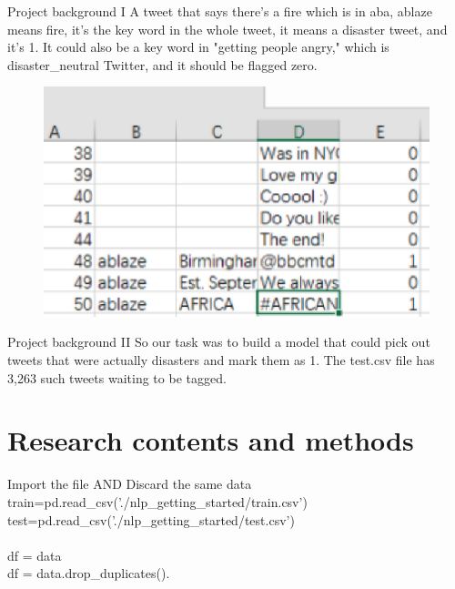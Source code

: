 \documentclass[
 size=14pt,
 paper=smartboard,  %
 mode=present, 		%
 display=slides, 	%
 style=tuliplab,  	%
 pauseslide,
 fleqn,leqno]{powerdot}
\begin{document}
\begin{slide}{Project background I}
A tweet that says there's a fire which is in aba, ablaze means fire, it's the key word in the whole tweet, it means a disaster tweet, and it's 1. It could also be a key word in "getting people angry," which is disaster\_neutral Twitter, and it should be flagged zero. \\
\begin{center}
	\begin{figure}[htbp]
		\includegraphics[scale=0.8]{./pic/2.eps}
	\end{figure}
\end{center}
\end{slide}
\begin{slide}{Project background II}
	So our task was to build a model that could pick out tweets that were actually disasters and mark them as 1. The test.csv file has 3,263 such tweets waiting to be tagged.
\end{slide}

\section{Research contents and methods}

\begin{slide}{Import the file AND Discard the same data}
train=pd.read\_csv('./nlp\_getting\_started/train.csv')\\
test=pd.read\_csv('./nlp\_getting\_started/test.csv')\\
\\
df = data\\
df = data.drop\_duplicates().\\
\end{slide}
\end{document}
